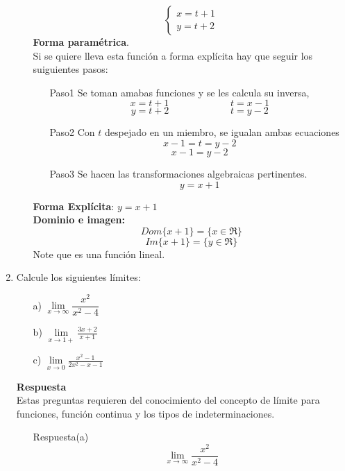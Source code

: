 \documentclass[10pt,twoside]{SelfArx} %
\begin{document}
\begin{enumerate}
\begin{enumerate}
\[ 	 \begin{cases}
	x=t+1\\
	y=t+2
	\end{cases} \]
	\textbf{Forma paramétrica}.\\
	Si se quiere lleva esta funci\'on a forma expl\'icita hay que seguir los suiguientes pasos:
	\begin{enumerate}
		\item[Paso1]	Se toman amabas funciones y se les calcula su inversa,
		\[ x=t+1\;\;\;\;\;\;\;\;\;\;\;\;\;\;\;\;\;\;\;\;\;\;\ t=x-1 \]
		\[ y=t+2\;\;\;\;\;\;\;\;\;\;\;\;\;\;\;\;\;\;\;\;\;\;\ t=y-2 \]
		\item[Paso2]	Con $ t $ despejado en un miembro, se igualan ambas ecuaciones
		\[ x-1=t=y-2 \]
		\[ x-1=y-2 \]
		\item[Paso3]	Se hacen las transformaciones algebraicas pertinentes.
		\[ y=x+1 \]
	\end{enumerate}
	\textbf{Forma Explícita}: $ y=x+1 $\\
	
	\textbf{Dominio e imagen:}
		\[ Dom\{x+1\}=\{x\in\Re\} \]
		\[ Im\{x+1\}=\{y\in\Re\} \]
		Note que es una funci\'on lineal.
\end{enumerate}

	\item	Calcule los siguientes límites:	%
			\begin{enumerate}
				\item[a)] $ \lim\limits_{x\rightarrow\infty}\dfrac{x^{2}}{x^{2}-4} $
				\item[b)] $ \lim\limits_{x\rightarrow1+}\frac{3x+2}{x+1} $
				\item[c)] $ \lim\limits_{x\rightarrow0}\frac{x^{2}-1}{2x^{2}-x-1} $
				
			\end{enumerate}
\textbf{Respuesta}\\			%
Estas preguntas requieren del conocimiento del concepto de límite para funciones, función continua y los tipos de indeterminaciones.\\
\begin{enumerate}
	\item[Respuesta(a)]
	\[ \lim\limits_{x\rightarrow\infty}\dfrac{x^{2}}{x^{2}-4} \]
	

\end{enumerate}
\end{enumerate}
\end{document}
